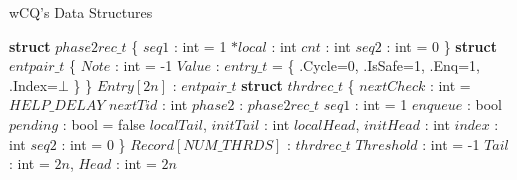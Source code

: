 \begin{algorithm}[!ht]
    \centering
    \captionsetup{justification=centering}
    \caption{wCQ's Data Structures \cite{wCQWaitFreeQueue}}
    \label{alg:wcq-structures}
    \scriptsize
    \begin{algorithmic}[1]
        \State \textbf{struct} $phase2rec\_t$ \{
        \State \hspace{1em} $seq1$ : int = 1
        \State \hspace{1em} $*local$ : int
        \State \hspace{1em} $cnt$ : int
        \State \hspace{1em} $seq2$ : int = 0
        \State \}
        \State
        \State \textbf{struct} $entpair\_t$ \{
        \State \hspace{1em} $Note$ : int = -1
        \State \hspace{1em} $Value$ : $entry\_t$ = \{ .Cycle=0, .IsSafe=1, .Enq=1, .Index=$\bot$ \}
        \State \}
        \State
        \State $Entry[2n]$ : $entpair\_t$
        \State
        \State \textbf{struct} $thrdrec\_t$ \{
        \State \hspace{1em} 
        \State \hspace{1em} $nextCheck$ : int = $HELP\_DELAY$
        \State \hspace{1em} $nextTid$ : int 
        \State \hspace{1em} 
        \State \hspace{1em} $phase2$ : $phase2rec\_t$ 
        \State \hspace{1em} $seq1$ : int = 1
        \State \hspace{1em} $enqueue$ : bool
        \State \hspace{1em} $pending$ : bool = false
        \State \hspace{1em} $localTail$, $initTail$ : int
        \State \hspace{1em} $localHead$, $initHead$ : int
        \State \hspace{1em} $index$ : int
        \State \hspace{1em} $seq2$ : int = 0
        \State \}
        \State
        \State $Record[NUM\_THRDS]$ : $thrdrec\_t$
        \State $Threshold$ : int = -1 
        \State $Tail$ : int = $2n$, $Head$ : int = $2n$
    \end{algorithmic}
\end{algorithm}

